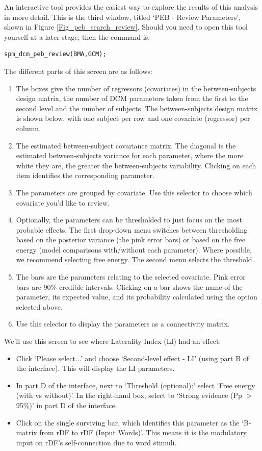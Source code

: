 \documentclass{article}
\begin{document}
An interactive tool provides the easiest way to explore the results of this analysis in more detail. This is the third window, titled `PEB - Review Parameters', shown in Figure \ref{Fig_peb_search_review}. Should you need to open this tool yourself at a later stage, then the command is:

\begin{lstlisting}[style=Matlab-editor,caption=PEB review tool]
spm_dcm_peb_review(BMA,GCM);
\end{lstlisting}

The different parts of this screen are as follows:

\begin{enumerate}[label=\Alph*)]
\item The boxes give the number of regressors (covariates) in the between-subjects design matrix, the number of DCM parameters taken from the first to the second level and the number of subjects. The between-subjects design matrix is shown below, with one subject per row and one covariate (regressor) per column.
\item The estimated between-subject covariance matrix. The diagonal is the estimated between-subjects variance for each parameter, where the more white they are, the greater the between-subjects variability. Clicking on each item identifies the corresponding parameter.
\item The parameters are grouped by covariate. Use this selector to choose which covariate you'd like to review.
\item Optionally, the parameters can be thresholded to just focus on the most probable effects. The first drop-down menu switches between thresholding based on the posterior variance (the pink error bars) or based on the free energy (model comparisons with/without each parameter). Where possible, we recommend selecting free energy. The second menu selects the threshold.
\item The bars are the parameters relating to the selected covariate. Pink error bars are 90\% credible intervals. Clicking on a bar shows the name of the parameter, its expected value, and its probability calculated using the option selected above.
\item Use this selector to display the parameters as a connectivity matrix.
\end{enumerate}

We'll use this screen to see where Laterality Index (LI) had an effect:

\begin{itemize}
    \item Click `Please select...' and choose `Second-level effect - LI' (using part B of the interface). This will display the LI parameters.
    \item In part D of the interface, next to `Threshold (optional):' select `Free energy (with vs without)'. In the right-hand box, select to `Strong evidence (Pp $>$ 95\%)' in part D of the interface.
    \item Click on the single surviving bar, which identifies this parameter as the `B-matrix from rDF to rDF (Input Words)'. This means it is the modulatory input on rDF's self-connection due to word stimuli.
\end{itemize}
\end{document}
